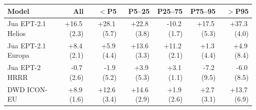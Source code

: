 \begin{tabular}{@{}lrrrrrr@{}}
\toprule
Model & All & $<$P5 & P5--25 & P25--75 & P75--95 & $>$P95 \\
\midrule
Jua EPT-2.1 Helios & +16.5\,(2.3) & +28.1\,(5.7) & +22.8\,(3.8) & -10.2\,(1.7) & +17.5\,(5.3) & +37.3\,(4.0) \\\addlinespace[0.35em]
Jua EPT-2.1 Europa & +8.4\,(2.1) & +5.9\,(4.4) & +13.6\,(3.3) & +11.2\,(2.1) & +1.3\,(4.4) & +4.9\,(8.4) \\\addlinespace[0.35em]
Jua EPT-2 HRRR & -0.7\,(2.6) & -1.9\,(5.2) & +3.9\,(5.3) & +3.1\,(1.1) & -7.2\,(9.5) & -6.0\,(8.5) \\\addlinespace[0.35em]
DWD ICON-EU & +8.9\,(1.6) & +12.6\,(3.4) & +14.6\,(2.9) & +1.9\,(2.6) & +2.7\,(3.1) & +13.7\,(6.9) \\
\bottomrule
\end{tabular}
